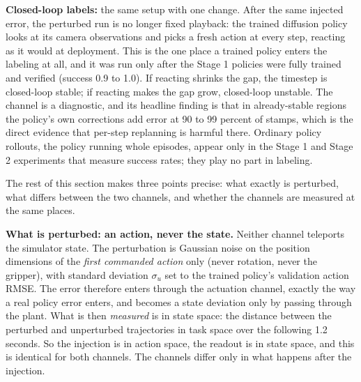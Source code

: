 \documentclass[11pt]{article}
\begin{document}
\textbf{Closed-loop labels:} the same setup with one change. After the same
injected error, the perturbed run is no longer fixed playback: the trained
diffusion policy looks at its camera observations and picks a fresh action
at every step, reacting as it would at deployment. This is the one place a
trained policy enters the labeling at all, and it was run only after the
Stage 1 policies were fully trained and verified (success 0.9 to 1.0). If
reacting shrinks the gap, the timestep is closed-loop stable; if reacting
makes the gap grow, closed-loop unstable. The channel is a diagnostic, and
its headline finding is that in already-stable regions the policy's own
corrections add error at 90 to 99 percent of stamps, which is the direct
evidence that per-step replanning is harmful there. Ordinary policy
rollouts, the policy running whole episodes, appear only in the Stage 1 and
Stage 2 experiments that measure success rates; they play no part in
labeling.

The rest of this section makes three points precise: what exactly is
perturbed, what differs between the two channels, and whether the channels
are measured at the same places.

\textbf{What is perturbed: an action, never the state.} Neither channel
teleports the simulator state. The perturbation is Gaussian noise on the
position dimensions of the \emph{first commanded action} only (never rotation,
never the gripper), with standard deviation $\sigma_u$ set to the trained
policy's validation action RMSE. The error therefore enters through the
actuation channel, exactly the way a real policy error enters, and becomes a
state deviation only by passing through the plant. What is then \emph{measured}
is in state space: the distance between the perturbed and unperturbed
trajectories in task space over the following 1.2 seconds. So the injection is
in action space, the readout is in state space, and this is identical for both
channels. The channels differ only in what happens after the injection.
\end{document}
